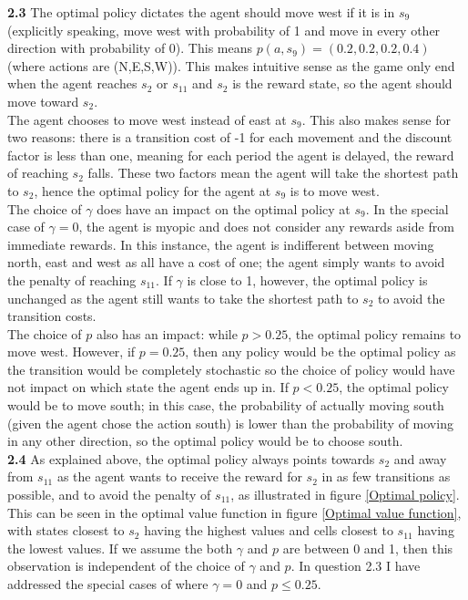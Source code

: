 \documentclass[12pt,twoside]{article}
\begin{document}
\textbf{2.3} The optimal policy dictates the agent should move west if it is in $s_9$ (explicitly speaking, move west with probability of 1 and move in every other direction with probability of 0). This means $p(a,s_9) = (0.2, 0.2, 0.2, 0.4)$ (where actions are (N,E,S,W)). This makes intuitive sense as the game only end when the agent reaches $s_2$ or $s_{11}$ and $s_2$ is the reward state, so the agent should move toward $s_2$. \\

The agent chooses to move west instead of east at $s_9$. This also makes sense for two reasons: there is a transition cost of -1 for each movement and the discount factor is less than one, meaning for each period the agent is delayed, the reward of reaching $s_2$ falls. These two factors mean the agent will take the shortest path to $s_2$, hence the optimal policy for the agent at $s_9$ is to move west. \\

The choice of $\gamma$ does have an impact on the optimal policy at $s_9$. In the special case of $\gamma=0$, the agent is myopic and does not consider any rewards aside from immediate rewards. In this instance, the agent is indifferent between moving north, east and west as all have a cost of one; the agent simply wants to avoid the penalty of reaching $s_{11}$. If $\gamma$ is close to 1, however, the optimal policy is unchanged as the agent still wants to take the shortest path to $s_2$ to avoid the transition costs.\\

The choice of $p$ also has an impact: while $p>0.25$, the optimal policy remains to move west. However, if $p=0.25$, then any policy would be the optimal policy as the transition would be completely stochastic so the choice of policy would have not impact on which state the agent ends up in. If $p<0.25$, the optimal policy would be to move south; in this case, the probability of actually moving south (given the agent chose the action south) is lower than the probability of moving in any other direction, so the optimal policy would be to choose south.\\

\textbf{2.4} As explained above, the optimal policy always points towards $s_2$ and away from $s_{11}$ as the agent wants to receive the reward for $s_2$ in as few transitions as possible, and to avoid the penalty of $s_{11}$, as illustrated in figure \ref{Optimal policy}. This can be seen in the optimal value function in figure \ref{Optimal value function}, with states closest to $s_2$ having the highest values and cells closest to $s_{11}$ having the lowest values. If we assume the both $\gamma$ and $p$ are between 0 and 1, then this observation is independent of the choice of $\gamma$ and $p$. In question 2.3 I have addressed the special cases of where $\gamma = 0$ and $p \leq 0.25$.\\
\end{document}
